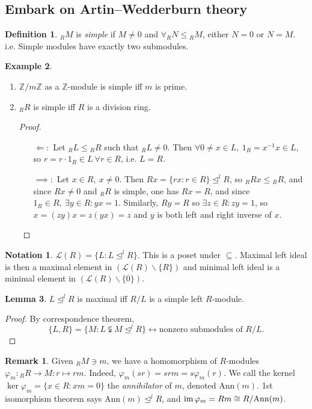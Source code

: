\documentclass[a4paper]{article}
\newcommand{\Z}{\mathbb{Z}}
\newcommand{\Ann}{\text{Ann}}
\newcommand{\im}{\text{im\,}}
\theoremstyle{definition}
\newtheorem{defn}{Definition}[subsection]
\newtheorem{lemma}[defn]{Lemma}
\newtheorem{example}[defn]{Example}
\newtheorem*{remark}{Remark}
\newtheorem*{notation}{Notation}
\begin{document}
\subsection{Embark on Artin–Wedderburn theory}
\begin{defn}
$_RM$ is \textit{simple} if $M\neq 0$ and $\forall _RN \leq {} _RM$, either $N=0$ or $N=M$. i.e. Simple modules have exactly two submodules.
\end{defn}
\begin{example}
\begin{enumerate}
\item $\Z/m\Z$ as a $\Z$-module is simple iff $m$ is prime.
\item $_RR$ is simple iff $R$ is a division ring.
\begin{proof}
\begin{itemize}
\item[$\Leftarrow:$] Let $_RL\leq {} _RR$ such that $_RL\neq 0$. Then $\forall 0\neq x\in L,\ 1_R=x^{-1}x\in L$, so $r=r\cdot 1_R\in L \ \forall r\in R$, i.e. $L=R$.
\item[$\implies:$] Let $x\in R,\ x\neq 0$. Then $Rx=\{rx:r\in R\}\unlhd^l R$, so $_R Rx\leq {} _RR$, and since $Rx\neq 0$ and $_RR$ is simple, one has $Rx=R$, and since $1_R\in R,\ \exists y\in R:yx=1$. Similarly, $Ry=R$ so $\exists z\in R:zy=1$, so $x=(zy)x=z(yx)=z$ and $y$ is both left and right inverse of $x$.
\end{itemize}
\end{proof}
\end{enumerate}
\end{example}

\begin{notation}
$\mathcal L(R)=\{L:L\unlhd^l R\}$. This is a poset under $\subseteq$. Maximal left ideal is then a maximal element in $(\mathcal L(R)\backslash\{R\})$ and minimal left ideal is a minimal element in $(\mathcal L(R)\backslash\{0\})$.
\end{notation}

\begin{lemma}
\label{lemma:LmaxiffRLsimple}
$L\unlhd^l R$ is maximal iff $R/L$ is a simple left $R$-module.
\end{lemma}
\begin{proof}
By correspondence theorem,
\[
\{L,R\}=\{M:L\subsetneqq M\unlhd^l R\} \leftrightarrow \text{nonzero submodules of }R/L.
\]
\end{proof}

\begin{remark}
Given $_RM\ni m$, we have a homomorphism of $R$-modules $\varphi_m:{}_RR\rightarrow M:r\mapsto rm$. Indeed, $\varphi_m(sr)=srm=s\varphi_m(r)$. We call the kernel $\ker\varphi_m=\{x\in R:xm=0\}$ the \textit{annihilator} of $m$, denoted $\Ann(m)$. 1st isomorphism theorem says $\Ann(m)\unlhd^l R$, and $\im\varphi_m=Rm\cong R/\Ann(m)$.
\end{remark}
\end{document}
